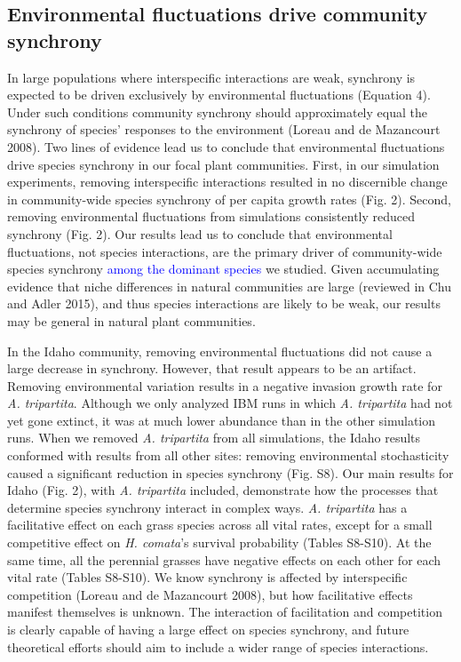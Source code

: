 \documentclass[11pt,]{article}
\begin{document}
\subsection{Environmental fluctuations drive community synchrony}

In large populations where interspecific interactions are weak,
synchrony is expected to be driven exclusively by environmental
fluctuations (Equation 4). Under such conditions community synchrony
should approximately equal the synchrony of species' responses to the
environment (Loreau and {{de Mazancourt}} 2008). Two lines of evidence
lead us to conclude that environmental fluctuations drive species
synchrony in our focal plant communities. First, in our simulation
experiments, removing interspecific interactions resulted in no
discernible change in community-wide species synchrony of per capita
growth rates (Fig. 2). Second, removing environmental fluctuations from
simulations consistently reduced synchrony (Fig. 2). Our results lead us
to conclude that environmental fluctuations, not species interactions,
are the primary driver of community-wide species synchrony
\textcolor{blue}{among the dominant species} we studied. Given
accumulating evidence that niche differences in natural communities are
large (reviewed in Chu and Adler 2015), and thus species interactions
are likely to be weak, our results may be general in natural plant
communities.

In the Idaho community, removing environmental fluctuations did not
cause a large decrease in synchrony. However, that result appears to be
an artifact. Removing environmental variation results in a negative
invasion growth rate for \emph{A. tripartita}. Although we only analyzed
IBM runs in which \emph{A. tripartita} had not yet gone extinct, it was
at much lower abundance than in the other simulation runs. When we
removed \emph{A. tripartita} from all simulations, the Idaho results
conformed with results from all other sites: removing environmental
stochasticity caused a significant reduction in species synchrony (Fig.
S8). Our main results for Idaho (Fig. 2), with \emph{A. tripartita}
included, demonstrate how the processes that determine species synchrony
interact in complex ways. \emph{A. tripartita} has a facilitative effect
on each grass species across all vital rates, except for a small
competitive effect on \emph{H. comata}'s survival probability (Tables
S8-S10). At the same time, all the perennial grasses have negative
effects on each other for each vital rate (Tables S8-S10). We know
synchrony is affected by interspecific competition (Loreau and {{de
Mazancourt}} 2008), but how facilitative effects manifest themselves is
unknown. The interaction of facilitation and competition is clearly
capable of having a large effect on species synchrony, and future
theoretical efforts should aim to include a wider range of species
interactions.
\end{document}
